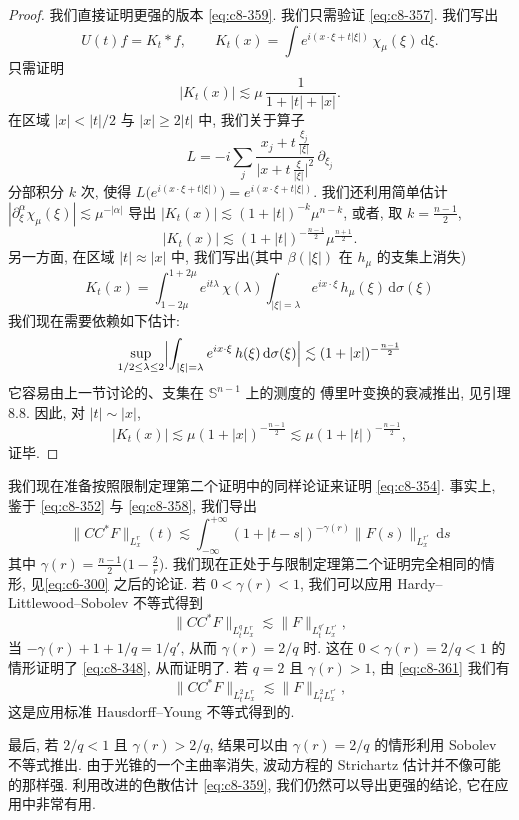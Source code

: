 \begin{proof}
我们直接证明更强的版本 \eqref{eq:c8-359}. 我们只需验证 \eqref{eq:c8-357}. 我们写出
\[
U(t)f=K_t*f, \qquad K_t(x)=\int e^{i(x\cdot\xi+t|\xi|)}\, \chi_{\mu}(\xi)\, \mathrm{d}\xi .
\]
只需证明
\[
|K_t(x)|\lesssim\mu\, \frac{1}{1+|t|+|x|}.
\]
在区域 $|x|<|t|/2$ 与 $|x|\geq2|t|$ 中, 我们关于算子
\[
L=-i\sum_j\frac{x_j+t\, \frac{\xi_j}{|\xi|}}{\bigl|x+t\, \frac{\xi}{|\xi|}\bigr|^2}\, \partial_{\xi_j}
\]
分部积分 $k$ 次, 使得 $L\bigl(e^{i(x\cdot\xi+t|\xi|)}\bigr)=e^{i(x\cdot\xi+t|\xi|)}$. 我们还利用简单估计 $|\partial_{\xi}^{\alpha}\chi_{\mu}(\xi)|\lesssim\mu^{-|\alpha|}$ 导出 $|K_t(x)|\lesssim(1+|t|)^{-k}\mu^{n-k}$, 或者, 取 $k=\frac{n-1}{2}$, 
\[
|K_t(x)|\lesssim(1+|t|)^{-\frac{n-1}{2}}\mu^{\frac{n+1}{2}}.
\]
另一方面, 在区域 $|t|\approx|x|$ 中, 我们写出(其中 $\beta(|\xi|)$ 在 $h_{\mu}$ 的支集上消失)
\[
K_t(x)=\int_{1-2\mu}^{1+2\mu}e^{it\lambda}\, \chi(\lambda)\int_{|\xi|=\lambda}e^{ix\cdot\xi}\, h_{\mu}(\xi)\, \mathrm{d}\sigma(\xi)
\]
我们现在需要依赖如下估计:
\begin{equation}
\sup_{1/2\leq\lambda\leq2}\Bigl|\int_{|\xi|=\lambda}e^{ix\cdot\xi}\, h(\xi)\, \mathrm{d}\sigma(\xi)\Bigr|\lesssim(1+|x|)^{-\frac{n-1}{2}}\label{eq:c8-360}
\end{equation}
它容易由上一节讨论的、支集在 $\mathbb{S}^{n-1}$ 上的测度的 傅里叶变换的衰减推出, 见引理 8.8. 因此, 对 $|t|\sim|x|$, 
\[
|K_t(x)|\lesssim\mu(1+|x|)^{-\frac{n-1}{2}}\lesssim\mu(1+|t|)^{-\frac{n-1}{2}}, 
\]
证毕. 
\end{proof}
我们现在准备按照限制定理第二个证明中的同样论证来证明 \eqref{eq:c8-354}. 事实上, 鉴于 \eqref{eq:c8-352} 与 \eqref{eq:c8-358}, 我们导出
\begin{equation}
\|CC^{*}F\|_{L_x^r}(t)\lesssim\int_{-\infty}^{+\infty}(1+|t-s|)^{-\gamma(r)}\|F(s)\|_{L_x^{r'}}\, \mathrm{d}s\label{eq:c8-361}
\end{equation}
其中 $\gamma(r)=\frac{n-1}{2}\bigl(1-\frac{2}{r}\bigr)$. 我们现在正处于与限制定理第二个证明完全相同的情形, 见\eqref{eq:c6-300} 之后的论证. 若 $0<\gamma(r)<1$, 我们可以应用 Hardy--Littlewood--Sobolev 不等式得到
\[
\|CC^{*}F\|_{L_t^q L_x^r}\lesssim\|F\|_{L_t^{q'} L_x^{r'}}, 
\]
当 $-\gamma(r)+1+1/q=1/q'$, 从而 $\gamma(r)=2/q$ 时. 这在 $0<\gamma(r)=2/q<1$ 的情形证明了 \eqref{eq:c8-348}, 从而证明了. 若 $q=2$ 且 $\gamma(r)>1$, 由 \eqref{eq:c8-361} 我们有
\[
\|CC^{*}F\|_{L_t^2 L_x^r}\lesssim\|F\|_{L_t^2 L_x^{r'}}, 
\]
这是应用标准 Hausdorff--Young 不等式得到的. 

最后, 若 $2/q<1$ 且 $\gamma(r)>2/q$, 结果可以由 $\gamma(r)=2/q$ 的情形利用 Sobolev 不等式推出. 由于光锥的一个主曲率消失, 波动方程的 Strichartz 估计并不像可能的那样强. 利用改进的色散估计 \eqref{eq:c8-359}, 我们仍然可以导出更强的结论, 它在应用中非常有用. 

